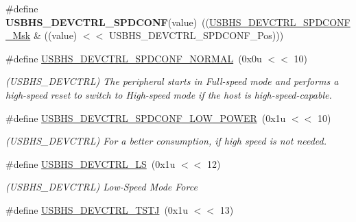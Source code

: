 \begin{DoxyCompactItemize}
\#define {\bfseries U\+S\+B\+H\+S\+\_\+\+D\+E\+V\+C\+T\+R\+L\+\_\+\+S\+P\+D\+C\+O\+NF}(value)~((\mbox{\hyperlink{group__SAMV71__USBHS_ga64a383ab4d768e9b4ef6f222682e32e3}{U\+S\+B\+H\+S\+\_\+\+D\+E\+V\+C\+T\+R\+L\+\_\+\+S\+P\+D\+C\+O\+N\+F\+\_\+\+Msk}} \& ((value) $<$$<$ U\+S\+B\+H\+S\+\_\+\+D\+E\+V\+C\+T\+R\+L\+\_\+\+S\+P\+D\+C\+O\+N\+F\+\_\+\+Pos)))
\item 
\mbox{\label{group__SAMS70__USBHS_ga8aeda232c83e31425d34f20b500a0d42}} 
\#define \mbox{\hyperlink{group__SAMS70__USBHS_ga8aeda232c83e31425d34f20b500a0d42}{U\+S\+B\+H\+S\+\_\+\+D\+E\+V\+C\+T\+R\+L\+\_\+\+S\+P\+D\+C\+O\+N\+F\+\_\+\+N\+O\+R\+M\+AL}}~(0x0u $<$$<$ 10)
\begin{DoxyCompactList}\small\item\em (U\+S\+B\+H\+S\+\_\+\+D\+E\+V\+C\+T\+RL) The peripheral starts in Full-\/speed mode and performs a high-\/speed reset to switch to High-\/speed mode if the host is high-\/speed-\/capable. \end{DoxyCompactList}\item 
\mbox{\label{group__SAMS70__USBHS_gab54274fdc81182035ae7a3b747062872}} 
\#define \mbox{\hyperlink{group__SAMS70__USBHS_gab54274fdc81182035ae7a3b747062872}{U\+S\+B\+H\+S\+\_\+\+D\+E\+V\+C\+T\+R\+L\+\_\+\+S\+P\+D\+C\+O\+N\+F\+\_\+\+L\+O\+W\+\_\+\+P\+O\+W\+ER}}~(0x1u $<$$<$ 10)
\begin{DoxyCompactList}\small\item\em (U\+S\+B\+H\+S\+\_\+\+D\+E\+V\+C\+T\+RL) For a better consumption, if high speed is not needed. \end{DoxyCompactList}\item 
\mbox{\label{group__SAMS70__USBHS_ga7853e3d068370111f7b402923d007cb6}} 
\#define \mbox{\hyperlink{group__SAMS70__USBHS_ga7853e3d068370111f7b402923d007cb6}{U\+S\+B\+H\+S\+\_\+\+D\+E\+V\+C\+T\+R\+L\+\_\+\+LS}}~(0x1u $<$$<$ 12)
\begin{DoxyCompactList}\small\item\em (U\+S\+B\+H\+S\+\_\+\+D\+E\+V\+C\+T\+RL) Low-\/\+Speed Mode Force \end{DoxyCompactList}\item 
\mbox{\label{group__SAMS70__USBHS_ga6b16d5f723c4580320ae47b542bae4f0}} 
\#define \mbox{\hyperlink{group__SAMS70__USBHS_ga6b16d5f723c4580320ae47b542bae4f0}{U\+S\+B\+H\+S\+\_\+\+D\+E\+V\+C\+T\+R\+L\+\_\+\+T\+S\+TJ}}~(0x1u $<$$<$ 13)
$$
\end{DoxyCompactItemize}
